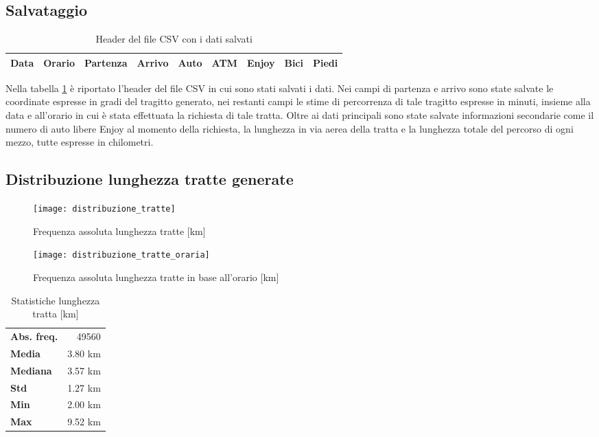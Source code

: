 \subsection{Salvataggio}

\begin{table}[H]
\centering
\begin{tabular}{ | c | c | c | c | c | c | c | c | c | }
\hline
Data & Orario & Partenza & Arrivo & Auto & ATM & Enjoy & Bici & Piedi \\
\hline
\end{tabular}
\caption{Header del file CSV con i dati salvati}
\label{table:7}
\end{table}

Nella tabella \ref{table:7} è riportato l'header del file CSV in cui sono stati salvati i dati. Nei campi di partenza e arrivo sono state salvate le coordinate espresse in gradi del tragitto generato, nei restanti campi le stime di percorrenza di tale tragitto espresse in minuti, insieme alla data e all'orario in cui è stata effettuata la richiesta di tale tratta. Oltre ai dati principali sono state salvate informazioni secondarie come il numero di auto libere Enjoy al momento della richiesta, la lunghezza in via aerea della tratta e la lunghezza totale del percorso di ogni mezzo, tutte espresse in chilometri.

\subsection{Distribuzione lunghezza tratte generate}

\begin{figure}[H]
\texttt{[image: distribuzione\_tratte]}
\caption{Frequenza assoluta lunghezza tratte [km]}
\label{image:2}
\end{figure}

\begin{figure}[H]
	\texttt{[image: distribuzione\_tratte\_oraria]}
	\caption{Frequenza assoluta lunghezza tratte in base all'orario [km]}
	\label{image:19}
\end{figure}

\begin{table}[H]
\centering
\begin{tabular}{ | l r | }
\hline
\textbf{Abs. freq.} & 49560 \\
\textbf{Media} & 3.80 km \\
\textbf{Mediana} & 3.57 km \\
\textbf{Std} & 1.27 km \\
\textbf{Min} & 2.00 km \\
\textbf{Max} & 9.52 km \\
\hline
\end{tabular}
\caption{Statistiche lunghezza tratta [km]}
\label{table:2}
\end{table}

